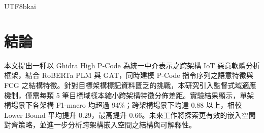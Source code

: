 \documentclass[10pt, a4paper, twocolumn]{article}
\begin{document}
\begin{CJK*}{UTF8}{bkai}
\section{結論}

本文提出一種以 Ghidra High P-Code 為統一中介表示之跨架構 IoT 惡意軟體分析框架，結合 RoBERTa PLM 與 GAT，同時建模 P-Code 指令序列之語意特徵與 FCG 之結構特徵。針對目標架構標記資料匱乏的挑戰，本研究引入監督式域適應機制，僅需每類 5 筆目標域樣本縮小跨架構特徵分佈差距。實驗結果顯示，單架構場景下各架構 F1-macro 均超過 94\%；跨架構場景下均達 0.88 以上，相較 Lower Bound 平均提升 0.29，最高提升 0.66。未來工作將探索更有效的嵌入空間對齊策略，並進一步分析跨架構嵌入空間之結構與可解釋性。





\end{CJK*}
\end{document}
